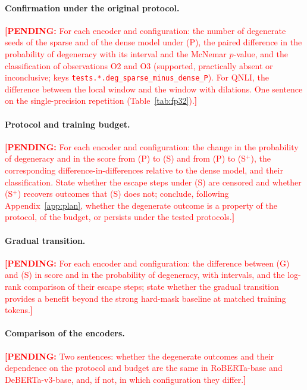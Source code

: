 \documentclass[10pt]{article}
\newcommand{\pending}[1]{\textcolor{red}{\textbf{[PENDING:} #1\textbf{]}}}
\begin{document}
\paragraph{Confirmation under the original protocol.} \pending{For each encoder and configuration: the number of degenerate seeds of the sparse and of the dense model under (P), the paired difference in the probability of degeneracy with its interval and the McNemar $p$-value, and the classification of observations O2 and O3 (supported, practically absent or inconclusive; keys \texttt{tests.*.deg\_sparse\_minus\_dense\_P}). For QNLI, the difference between the local window and the window with dilations. One sentence on the single-precision repetition (Table~\ref{tab:fp32}).}

\paragraph{Protocol and training budget.} \pending{For each encoder and configuration: the change in the probability of degeneracy and in the score from (P) to (S) and from (P) to (S$^{+}$), the corresponding difference-in-differences relative to the dense model, and their classification. State whether the escape steps under (S) are censored and whether (S$^{+}$) recovers outcomes that (S) does not; conclude, following Appendix~\ref{app:plan}, whether the degenerate outcome is a property of the protocol, of the budget, or persists under the tested protocols.}

\paragraph{Gradual transition.} \pending{For each encoder and configuration: the difference between (G) and (S) in score and in the probability of degeneracy, with intervals, and the log-rank comparison of their escape steps; state whether the gradual transition provides a benefit beyond the strong hard-mask baseline at matched training tokens.}

\paragraph{Comparison of the encoders.} \pending{Two sentences: whether the degenerate outcomes and their dependence on the protocol and budget are the same in RoBERTa-base and DeBERTa-v3-base, and, if not, in which configuration they differ.}

\end{document}
